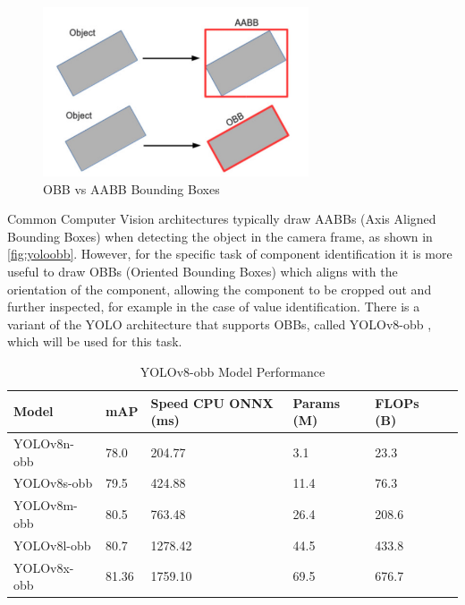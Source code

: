 \begin{figure}[H]
    \begin{minipage}[h]{\textwidth}
        \centering
        \includegraphics[height=5cm]{imgs/software/yoloobb.png}
        \caption{OBB vs AABB Bounding Boxes \cite{aabbphoto}}
        \label{fig:yoloobb}
    \end{minipage}
\end{figure}

Common Computer Vision architectures typically draw AABBs (Axis Aligned Bounding Boxes) when detecting the object in the camera frame, as shown in \autoref{fig:yoloobb}. However, for the specific task of component identification it is more useful to draw OBBs (Oriented Bounding Boxes) which aligns with the orientation of the component, allowing the component to be cropped out and further inspected, for example in the case of value identification. There is a variant of the YOLO architecture that supports OBBs, called YOLOv8-obb \cite{yolov8}, which will be used for this task. 

\begin{table}[H]
    \centering
    {\fontsize{10pt}{12pt}\selectfont
    \begin{tabular}{|l|l|l|l|l|l|}
        \hline
        \textbf{Model} & \textbf{mAP\raisebox{-1pt}{\textsuperscript{50}}} & \textbf{Speed CPU ONNX (ms)} & \textbf{Params (M)} & \textbf{FLOPs (B)} \\
        \hline
        YOLOv8n-obb & 78.0 & 204.77 & 3.1 & 23.3 \\
        \hline
        YOLOv8s-obb & 79.5 & 424.88 & 11.4 & 76.3 \\
        \hline
        YOLOv8m-obb & 80.5 & 763.48 & 26.4 & 208.6 \\
        \hline
        YOLOv8l-obb & 80.7 & 1278.42 & 44.5 & 433.8 \\
        \hline
        YOLOv8x-obb & 81.36 & 1759.10 & 69.5 & 676.7 \\
        \hline
    \end{tabular}
    }
    \caption{YOLOv8-obb Model Performance \cite{yolov8}}
    \label{tab:yoloperformanceobb}
\end{table}

